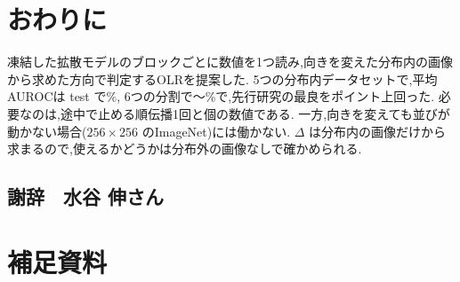 \documentclass[MIRU,submit]{miru2025j}
\newcommand{\Ours}{OLR}   %
\begin{document}
\section{おわりに}
凍結した拡散モデルのブロックごとに数値を1つ読み,向きを変えた分布内の画像から求めた方向で判定する\Ours{}を提案した. 5つの分布内データセットで,平均AUROCは test で\olTestOL\%, 6つの分割で\olSixMin{}〜\olSixMax\%で,先行研究の最良を\olGapCfsKnn{}ポイント上回った. 必要なのは,途中で止める順伝播1回と\olNStored{}個の数値である. 一方,向きを変えても並びが動かない場合($256{\times}256$ のImageNet)には働かない. $\Delta$ は分布内の画像だけから求まるので,使えるかどうかは分布外の画像なしで確かめられる.

\subsection*{{\normalsize 謝辞　水谷 伸さん}}



\onecolumn   %
\raggedbottom   %
\setlength{\intextsep}{6pt plus 2pt minus 2pt}   %
\section*{補足資料}
\renewcommand{\thetable}{A\arabic{table}}\setcounter{table}{0}
\renewcommand{\thefigure}{A\arabic{figure}}\setcounter{figure}{0}
\end{document}
